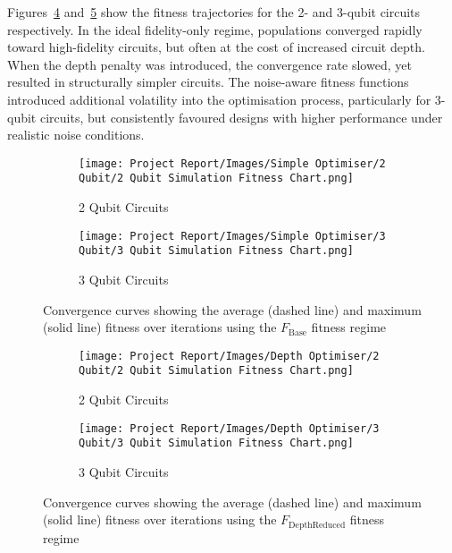 \documentclass[11pt,a4paper]{article}
\begin{document}
Figures~\ref{fig:simple_fitness_2q} and~\ref{fig:simple_fitness_3q} show the fitness trajectories for the 2- and 3-qubit circuits respectively. In the ideal fidelity-only regime, populations converged rapidly toward high-fidelity circuits, but often at the cost of increased circuit depth. When the depth penalty was introduced, the convergence rate slowed, yet resulted in structurally simpler circuits. The noise-aware fitness functions introduced additional volatility into the optimisation process, particularly for 3-qubit circuits, but consistently favoured designs with higher performance under realistic noise conditions.

\begin{figure}[H]
\centering
\begin{subfigure}{.5\textwidth}
  \centering
  \texttt{[image: Project Report/Images/Simple Optimiser/2 Qubit/2 Qubit Simulation Fitness Chart.png]}
  \caption{2 Qubit Circuits}
  \label{fig:simple_fitness_2q}
\end{subfigure}%
\begin{subfigure}{.5\textwidth}
  \centering
  \texttt{[image: Project Report/Images/Simple Optimiser/3 Qubit/3 Qubit Simulation Fitness Chart.png]}
  \caption{3 Qubit Circuits}
  \label{fig:simple_fitness_3q}
\end{subfigure}
\caption{Convergence curves showing the average (dashed line) and maximum (solid line) fitness over iterations using the $F_{\mathrm{Base}}$ fitness regime}
\label{fig:simple_fitness_charts}
\end{figure}

\begin{figure}[H]
\centering
\begin{subfigure}{.5\textwidth}
  \centering
  \texttt{[image: Project Report/Images/Depth Optimiser/2 Qubit/2 Qubit Simulation Fitness Chart.png]}
  \caption{2 Qubit Circuits}
  \label{fig:simple_fitness_2q}
\end{subfigure}%
\begin{subfigure}{.5\textwidth}
  \centering
  \texttt{[image: Project Report/Images/Depth Optimiser/3 Qubit/3 Qubit Simulation Fitness Chart.png]}
  \caption{3 Qubit Circuits}
  \label{fig:simple_fitness_3q}
\end{subfigure}
\caption{Convergence curves showing the average (dashed line) and maximum (solid line) fitness over iterations using the $F_{\mathrm{DepthReduced}}$ fitness regime}
\label{fig:simple_fitness_charts}
\end{figure}
\end{document}
